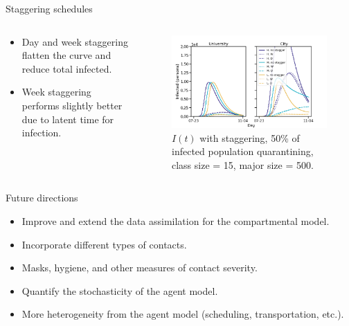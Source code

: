 \documentclass[aspectratio=169]{beamer}
\begin{document}
\begin{frame}{Staggering schedules}
    \vfill
    \begin{columns}
    \begin{column}{.3\textwidth}
        \begin{itemize}
            \item Day and week staggering flatten the curve and reduce total infected.
            \item Week staggering performs slightly better due to latent time for infection.
        \end{itemize}
    \end{column}
    \begin{column}{.7\textwidth}
        \begin{figure}[H]
            \centering
            \includegraphics[width=\textwidth]{figures/staggering_schedules.png}
            \caption{$I(t)$ with staggering, 50\% of infected population quarantining, class size = 15, major size = 500.}
        \end{figure}
    \end{column}
    \end{columns}
    \vfill
\end{frame}

\begin{frame}{Future directions}
    \vfill
    \begin{itemize}
        \item Improve and extend the data assimilation for the compartmental model.
        \item Incorporate different types of contacts.
        \item Masks, hygiene, and other measures of contact severity.
        \item Quantify the stochasticity of the agent model.
        \item More heterogeneity from the agent model (scheduling, transportation, etc.).
    \end{itemize}
    \vfill
\end{frame}
\end{document}

